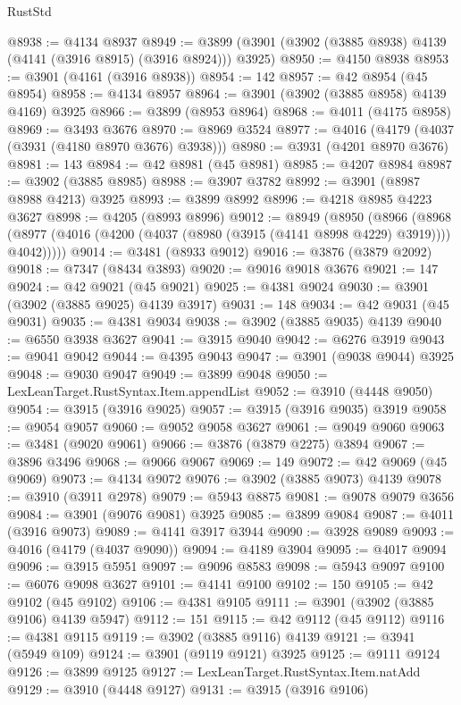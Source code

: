 \begin{lexlean}{RustStd}
\begin{coremodule}
@8938 := @4134 @8937
@8949 := @3899 (@3901 (@3902 (@3885 @8938) @4139 (@4141 (@3916 @8915) (@3916 @8924))) @3925)
@8950 := @4150 @8938
@8953 := @3901 (@4161 (@3916 @8938))
@8954 := 142
@8957 := @42 @8954 (@45 @8954)
@8958 := @4134 @8957
@8964 := @3901 (@3902 (@3885 @8958) @4139 @4169) @3925
@8966 := @3899 (@8953 @8964)
@8968 := @4011 (@4175 @8958)
@8969 := @3493 @3676
@8970 := @8969 @3524
@8977 := @4016 (@4179 (@4037 (@3931 (@4180 @8970 @3676) @3938)))
@8980 := @3931 (@4201 @8970 @3676)
@8981 := 143
@8984 := @42 @8981 (@45 @8981)
@8985 := @4207 @8984
@8987 := @3902 (@3885 @8985)
@8988 := @3907 @3782
@8992 := @3901 (@8987 @8988 @4213) @3925
@8993 := @3899 @8992
@8996 := @4218 @8985 @4223 @3627
@8998 := @4205 (@8993 @8996)
@9012 := @8949
    (@8950
      (@8966
        (@8968 (@8977 (@4016 (@4200 (@4037 (@8980 (@3915 (@4141 @8998 @4229) @3919)))) @4042)))))
@9014 := @3481 (@8933 @9012)
@9016 := @3876 (@3879 @2092)
@9018 := @7347 (@8434 @3893)
@9020 := @9016 @9018 @3676
@9021 := 147
@9024 := @42 @9021 (@45 @9021)
@9025 := @4381 @9024
@9030 := @3901 (@3902 (@3885 @9025) @4139 @3917)
@9031 := 148
@9034 := @42 @9031 (@45 @9031)
@9035 := @4381 @9034
@9038 := @3902 (@3885 @9035) @4139
@9040 := @6550 @3938 @3627
@9041 := @3915 @9040
@9042 := @6276 @3919
@9043 := @9041 @9042
@9044 := @4395 @9043
@9047 := @3901 (@9038 @9044) @3925
@9048 := @9030 @9047
@9049 := @3899 @9048
@9050 := LexLeanTarget.RustSyntax.Item.appendList
@9052 := @3910 (@4448 @9050)
@9054 := @3915 (@3916 @9025)
@9057 := @3915 (@3916 @9035) @3919
@9058 := @9054 @9057
@9060 := @9052 @9058 @3627
@9061 := @9049 @9060
@9063 := @3481 (@9020 @9061)
@9066 := @3876 (@3879 @2275) @3894
@9067 := @3896 @3496
@9068 := @9066 @9067
@9069 := 149
@9072 := @42 @9069 (@45 @9069)
@9073 := @4134 @9072
@9076 := @3902 (@3885 @9073) @4139
@9078 := @3910 (@3911 @2978)
@9079 := @5943 @8875
@9081 := @9078 @9079 @3656
@9084 := @3901 (@9076 @9081) @3925
@9085 := @3899 @9084
@9087 := @4011 (@3916 @9073)
@9089 := @4141 @3917 @3944
@9090 := @3928 @9089
@9093 := @4016 (@4179 (@4037 @9090))
@9094 := @4189 @3904
@9095 := @4017 @9094
@9096 := @3915 @5951
@9097 := @9096 @8583
@9098 := @5943 @9097
@9100 := @6076 @9098 @3627
@9101 := @4141 @9100
@9102 := 150
@9105 := @42 @9102 (@45 @9102)
@9106 := @4381 @9105
@9111 := @3901 (@3902 (@3885 @9106) @4139 @5947)
@9112 := 151
@9115 := @42 @9112 (@45 @9112)
@9116 := @4381 @9115
@9119 := @3902 (@3885 @9116) @4139
@9121 := @3941 (@5949 @109)
@9124 := @3901 (@9119 @9121) @3925
@9125 := @9111 @9124
@9126 := @3899 @9125
@9127 := LexLeanTarget.RustSyntax.Item.natAdd
@9129 := @3910 (@4448 @9127)
@9131 := @3915 (@3916 @9106)

\end{coremodule}
\end{lexlean}
